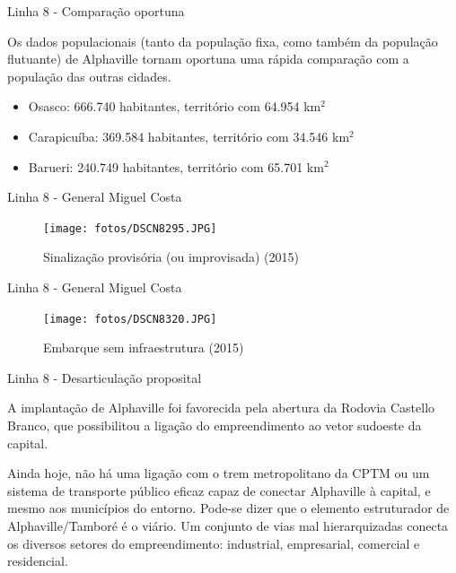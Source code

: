 \documentclass[spectratio=169, portuguese]{beamer}
\begin{document}

\begin{frame}{Linha 8 - Comparação oportuna}
	
	Os dados populacionais (tanto da população fixa, como também da população flutuante) de Alphaville tornam oportuna uma rápida comparação com a população das outras cidades.
	
	\begin{itemize}
		\item Osasco: 666.740 habitantes, território com 64.954 km$^2$\cite{ibgeOSA}
		\item Carapicuíba: 369.584 habitantes, território com 34.546 km$^2$\cite{ibgeCPB}
		\item Barueri: 240.749 habitantes, território com 65.701 km$^2$\cite{ibgeBRU}
	\end{itemize}
	
\end{frame}


\begin{frame}{Linha 8 - General Miguel Costa}
	
	\begin{figure}[h]
		\caption{Sinalização provisória (ou improvisada) (2015)}
		\texttt{[image: fotos/DSCN8295.JPG]}
	\end{figure}
	
\end{frame}


\begin{frame}{Linha 8 - General Miguel Costa}
	
	\begin{figure}[h]
		\caption{Embarque sem infraestrutura (2015)}
		\texttt{[image: fotos/DSCN8320.JPG]}
	\end{figure}
	
\end{frame}


\begin{frame}{Linha 8 - Desarticulação proposital}
	
	\begin{exampleblock}{}
		A implantação de Alphaville foi favorecida pela abertura da Rodovia Castello Branco, que possibilitou a ligação do empreendimento ao vetor sudoeste da capital.
		
		Ainda hoje, não há uma ligação com o trem metropolitano da CPTM ou um sistema de transporte público eficaz capaz de conectar Alphaville à capital, e mesmo aos municípios do entorno. Pode-se dizer que o elemento estruturador de Alphaville/Tamboré é o viário. Um conjunto de vias mal hierarquizadas conecta os diversos setores do empreendimento: industrial, empresarial, comercial e residencial.
		\cite[pág. 125]{Falcone}
	\end{exampleblock}
	
\end{frame}
\end{document}
